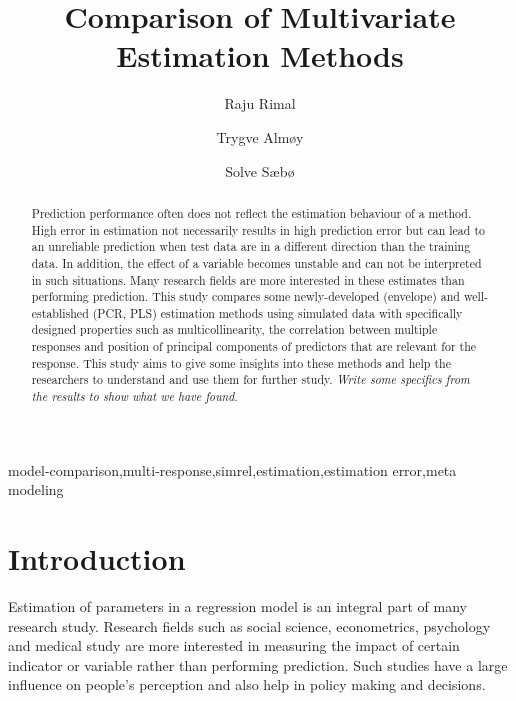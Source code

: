 \documentclass[12pt,3p,authoryear]{elsarticle}
\begin{document}
\begin{frontmatter}

  \title{Comparison of Multivariate Estimation Methods}
  
    \author[KBM]{Raju Rimal}
    \author[KBM]{Trygve Almøy}
  
    \author[NMBU]{Solve Sæbø}
  
      \address[KBM]{Faculty of Chemistry and Bioinformatics, Norwegian University of Life
Sciences, Ås, Norway}
    \address[NMBU]{Prorector, Norwegian University of Life Sciences, Ås, Norway}
  
  \begin{abstract}
  Prediction performance often does not reflect the estimation behaviour
  of a method. High error in estimation not necessarily results in high
  prediction error but can lead to an unreliable prediction when test data
  are in a different direction than the training data. In addition, the
  effect of a variable becomes unstable and can not be interpreted in such
  situations. Many research fields are more interested in these estimates
  than performing prediction. This study compares some newly-developed
  (envelope) and well-established (PCR, PLS) estimation methods using
  simulated data with specifically designed properties such as
  multicollinearity, the correlation between multiple responses and
  position of principal components of predictors that are relevant for the
  response. This study aims to give some insights into these methods and
  help the researchers to understand and use them for further study.
  \emph{Write some specifics from the results to show what we have found.}
  \end{abstract}
   \begin{keyword} model-comparison,multi-response,simrel,estimation,estimation error,meta modeling\end{keyword}

\end{frontmatter}

\section{Introduction}\label{introduction}

Estimation of parameters in a regression model is an integral part of
many research study. Research fields such as social science,
econometrics, psychology and medical study are more interested in
measuring the impact of certain indicator or variable rather than
performing prediction. Such studies have a large influence on people's
perception and also help in policy making and decisions.
\end{document}
